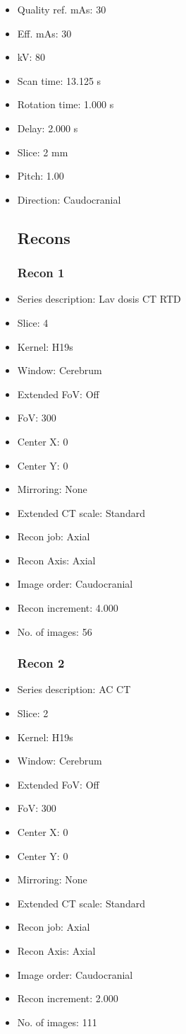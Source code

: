 \documentclass[12pt]{article}
\begin{document}
\begin{itemize}[noitemsep]
\subsection{Scan}
\item Quality ref. mAs: 30\item Eff. mAs: 30\item kV: 80\item Scan time: 13.125 s\item Rotation time: 1.000 s\item Delay: 2.000 s\item Slice: 2 mm\item Pitch: 1.00\item Direction: Caudocranial\subsection{Recons}

\subsubsection{Recon 1}
\item Series description: Lav dosis CT RTD
\item Slice: 4
\item Kernel: H19s
\item Window: Cerebrum
\item Extended FoV: Off
\item FoV: 300
\item Center X: 0
\item Center Y: 0
\item Mirroring: None
\item Extended CT scale: Standard
\item Recon job: Axial
\item Recon Axis: Axial
\item Image order: Caudocranial
\item Recon increment: 4.000
\item No. of images: 56
\subsubsection{Recon 2}
\item Series description: AC  CT
\item Slice: 2
\item Kernel: H19s
\item Window: Cerebrum
\item Extended FoV: Off
\item FoV: 300
\item Center X: 0
\item Center Y: 0
\item Mirroring: None
\item Extended CT scale: Standard
\item Recon job: Axial
\item Recon Axis: Axial
\item Image order: Caudocranial
\item Recon increment: 2.000
\item No. of images: 111

\end{itemize}
\end{document}
